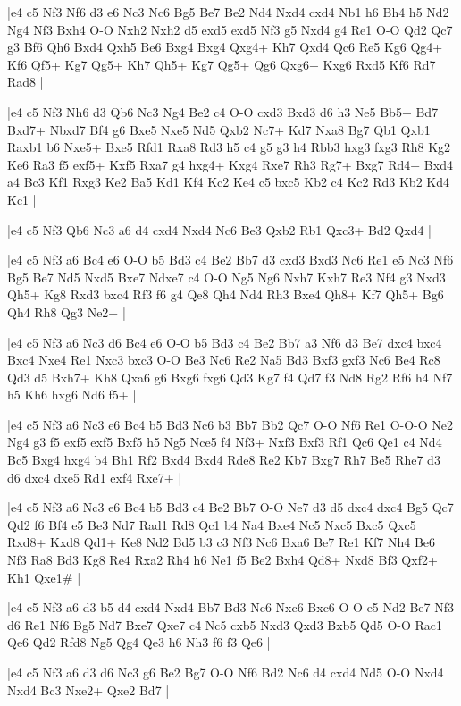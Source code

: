 \whitename{}
\blackname{}
\makegametitle
|e4 c5 Nf3 Nf6 d3 e6 Nc3 Nc6 Bg5 Be7 Be2 Nd4 Nxd4 cxd4 Nb1 h6 Bh4 h5 Nd2 Ng4 Nf3 Bxh4 O-O Nxh2 Nxh2 d5 exd5 exd5 Nf3 g5 Nxd4 g4 Re1 O-O Qd2 Qc7 g3 Bf6 Qh6 Bxd4 Qxh5 Be6 Bxg4 Bxg4 Qxg4+ Kh7 Qxd4 Qc6 Re5 Kg6 Qg4+ Kf6 Qf5+ Kg7 Qg5+ Kh7 Qh5+ Kg7 Qg5+ Qg6 Qxg6+ Kxg6 Rxd5 Kf6 Rd7 Rad8  |

\whitename{}
\blackname{}
\makegametitle
|e4 c5 Nf3 Nh6 d3 Qb6 Nc3 Ng4 Be2 c4 O-O cxd3 Bxd3 d6 h3 Ne5 Bb5+ Bd7 Bxd7+ Nbxd7 Bf4 g6 Bxe5 Nxe5 Nd5 Qxb2 Nc7+ Kd7 Nxa8 Bg7 Qb1 Qxb1 Raxb1 b6 Nxe5+ Bxe5 Rfd1 Rxa8 Rd3 h5 c4 g5 g3 h4 Rbb3 hxg3 fxg3 Rh8 Kg2 Ke6 Ra3 f5 exf5+ Kxf5 Rxa7 g4 hxg4+ Kxg4 Rxe7 Rh3 Rg7+ Bxg7 Rd4+ Bxd4 a4 Bc3 Kf1 Rxg3 Ke2 Ba5 Kd1 Kf4 Kc2 Ke4 c5 bxc5 Kb2 c4 Kc2 Rd3 Kb2 Kd4 Kc1  |

\whitename{}
\blackname{}
\makegametitle
|e4 c5 Nf3 Qb6 Nc3 a6 d4 cxd4 Nxd4 Nc6 Be3 Qxb2 Rb1 Qxc3+ Bd2 Qxd4  |

\whitename{}
\blackname{}
\makegametitle
|e4 c5 Nf3 a6 Bc4 e6 O-O b5 Bd3 c4 Be2 Bb7 d3 cxd3 Bxd3 Nc6 Re1 e5 Nc3 Nf6 Bg5 Be7 Nd5 Nxd5 Bxe7 Ndxe7 c4 O-O Ng5 Ng6 Nxh7 Kxh7 Re3 Nf4 g3 Nxd3 Qh5+ Kg8 Rxd3 bxc4 Rf3 f6 g4 Qe8 Qh4 Nd4 Rh3 Bxe4 Qh8+ Kf7 Qh5+ Bg6 Qh4 Rh8 Qg3 Ne2+  |

\whitename{}
\blackname{}
\makegametitle
|e4 c5 Nf3 a6 Nc3 d6 Bc4 e6 O-O b5 Bd3 c4 Be2 Bb7 a3 Nf6 d3 Be7 dxc4 bxc4 Bxc4 Nxe4 Re1 Nxc3 bxc3 O-O Be3 Nc6 Re2 Na5 Bd3 Bxf3 gxf3 Nc6 Be4 Rc8 Qd3 d5 Bxh7+ Kh8 Qxa6 g6 Bxg6 fxg6 Qd3 Kg7 f4 Qd7 f3 Nd8 Rg2 Rf6 h4 Nf7 h5 Kh6 hxg6 Nd6 f5+  |

\whitename{}
\blackname{}
\makegametitle
|e4 c5 Nf3 a6 Nc3 e6 Bc4 b5 Bd3 Nc6 b3 Bb7 Bb2 Qc7 O-O Nf6 Re1 O-O-O Ne2 Ng4 g3 f5 exf5 exf5 Bxf5 h5 Ng5 Nce5 f4 Nf3+ Nxf3 Bxf3 Rf1 Qc6 Qe1 c4 Nd4 Bc5 Bxg4 hxg4 b4 Bh1 Rf2 Bxd4 Bxd4 Rde8 Re2 Kb7 Bxg7 Rh7 Be5 Rhe7 d3 d6 dxc4 dxe5 Rd1 exf4 Rxe7+  |

\whitename{}
\blackname{}
\makegametitle
|e4 c5 Nf3 a6 Nc3 e6 Bc4 b5 Bd3 c4 Be2 Bb7 O-O Ne7 d3 d5 dxc4 dxc4 Bg5 Qc7 Qd2 f6 Bf4 e5 Be3 Nd7 Rad1 Rd8 Qc1 b4 Na4 Bxe4 Nc5 Nxc5 Bxc5 Qxc5 Rxd8+ Kxd8 Qd1+ Ke8 Nd2 Bd5 b3 c3 Nf3 Nc6 Bxa6 Be7 Re1 Kf7 Nh4 Be6 Nf3 Ra8 Bd3 Kg8 Re4 Rxa2 Rh4 h6 Ne1 f5 Be2 Bxh4 Qd8+ Nxd8 Bf3 Qxf2+ Kh1 Qxe1\#  |

\whitename{}
\blackname{}
\makegametitle
|e4 c5 Nf3 a6 d3 b5 d4 cxd4 Nxd4 Bb7 Bd3 Nc6 Nxc6 Bxc6 O-O e5 Nd2 Be7 Nf3 d6 Re1 Nf6 Bg5 Nd7 Bxe7 Qxe7 c4 Nc5 cxb5 Nxd3 Qxd3 Bxb5 Qd5 O-O Rac1 Qe6 Qd2 Rfd8 Ng5 Qg4 Qe3 h6 Nh3 f6 f3 Qe6  |

\whitename{}
\blackname{}
\makegametitle
|e4 c5 Nf3 a6 d3 d6 Nc3 g6 Be2 Bg7 O-O Nf6 Bd2 Nc6 d4 cxd4 Nd5 O-O Nxd4 Nxd4 Bc3 Nxe2+ Qxe2 Bd7  |

